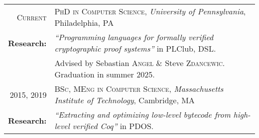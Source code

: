 \begin{tabular}{rl}
\textsc{Current}   & \textsc{PhD in Computer Science}, \emph{University of Pennsylvania}, Philadelphia, PA\\
\textbf{Research:} & \emph{``Programming languages for formally verified cryptographic proof systems''} in PLClub, DSL. \\
                   & Advised by Sebastian \textsc{Angel} \& Steve \textsc{Zdancewic}. Graduation in summer 2025. \\[0.5em]
2015, 2019         & \textsc{BSc, MEng in Computer Science}, \emph{Massachusetts Institute of Technology}, Cambridge, MA\\
\textbf{Research:} & \emph{``Extracting and optimizing low-level bytecode from high-level verified Coq''} in PDOS.
\end{tabular}
